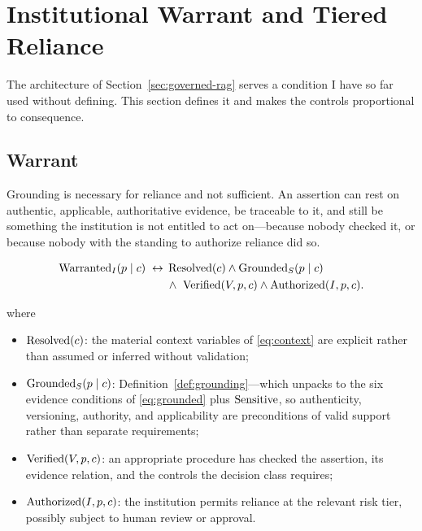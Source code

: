 \chapter{Institutional Warrant and Tiered Reliance}
\label{ch:warrant-tiers}
\label{sec:tiers}

The architecture of Section~\ref{sec:governed-rag} serves a condition I have so far
used without defining. This section defines it and makes the controls proportional
to consequence.

\section{Warrant}

Grounding is necessary for reliance and not sufficient. An assertion can rest on
authentic, applicable, authoritative evidence, be traceable to it, and still be
something the institution is not entitled to act on---because nobody checked it, or
because nobody with the standing to authorize reliance did so.

\begin{definition}
\label{def:warrant}
\begin{equation}
  \begin{aligned}
  \operatorname{Warranted}_I(p \mid c) \;\leftrightarrow\;
    &\operatorname{Resolved}(c) \wedge \operatorname{Grounded}_S(p \mid c)\\
    &\wedge\ \operatorname{Verified}(V, p, c) \wedge \operatorname{Authorized}(I, p, c).
  \end{aligned}
  \label{eq:warrant}
\end{equation}
\end{definition}

where

\begin{itemize}
  \item $\operatorname{Resolved}(c)$: the material context variables of \eqref{eq:context} are
        explicit rather than assumed or inferred without validation;
  \item $\operatorname{Grounded}_S(p \mid c)$: Definition~\ref{def:grounding}---which unpacks to the
        six evidence conditions of \eqref{eq:grounded} plus $\operatorname{Sensitive}$, so
        authenticity, versioning, authority, and applicability are preconditions of
        valid support rather than separate requirements;
  \item $\operatorname{Verified}(V, p, c)$: an appropriate procedure has checked the assertion,
        its evidence relation, and the controls the decision class requires;
  \item $\operatorname{Authorized}(I, p, c)$: the institution permits reliance at the relevant
        risk tier, possibly subject to human review or approval.
\end{itemize}

